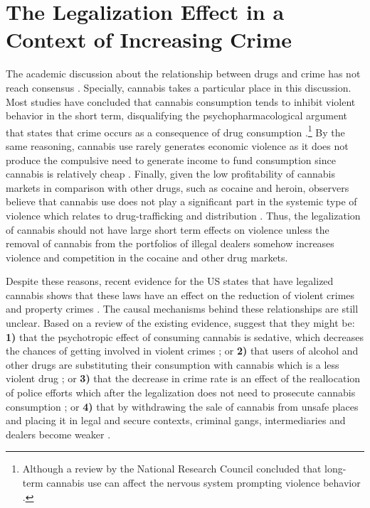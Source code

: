 \documentclass[11pt]{article}
\begin{document}
\section{The Legalization Effect in a Context of Increasing Crime}
The academic discussion about the relationship between drugs and crime has not reach consensus \citep{white2000dynamics}. Specially, cannabis takes a particular place in this discussion. Most studies have concluded that cannabis consumption tends to inhibit violent behavior in the short term, disqualifying the psychopharmacological argument \citep{white2000dynamics} that states that crime occurs as a consequence of drug consumption \citep{goldstein1985drugs}.\footnote{Although a review by the National Research Council concluded that long-term cannabis use can affect the nervous system prompting violence behavior \citep{national1994understanding}.} By the same reasoning, cannabis use rarely generates economic violence as it does not produce the compulsive need to generate income to fund consumption since cannabis is relatively cheap \citep{caulkins2016marijuana}. Finally, given the low profitability of cannabis markets in comparison with other drugs, such as cocaine and heroin, observers believe that cannabis use does not play a significant part in the systemic type of violence \citep{pacula2003marijuana, caulkins2015considering} which relates to drug-trafficking and distribution \citep{goldstein1985drugs}. Thus, the legalization of cannabis should not have large short term effects on violence unless the removal of cannabis from the portfolios of illegal dealers somehow increases violence and competition in the cocaine and other drug markets.

Despite these reasons, recent evidence for the US states that have legalized cannabis shows that these laws have an effect on the reduction of violent crimes and property crimes \citep{dragone2019crime, Indigo:2016, gavrilova2014legal, huber2016cannabis, brinkman2017not}. The causal mechanisms behind these relationships are still unclear. Based on a review of the existing evidence, \citet{dragone2019crime} suggest that they might be: \textbf{1)} that the psychotropic effect of consuming cannabis is sedative, which decreases the chances of getting involved in violent crimes \citep{no2001health, green2003being}; or \textbf{2)} that users of alcohol and other drugs are substituting their consumption with cannabis which is a less violent drug \citep{anderson2014legalization, kelly2014policing} ; or \textbf{3)} that the decrease in crime rate is an effect of the reallocation of police efforts which after the legalization does not need to prosecute cannabis consumption \citep{adda2014crime}; or \textbf{4)} that by withdrawing the sale of cannabis from unsafe places and placing it in legal and secure contexts, criminal gangs, intermediaries and dealers become weaker \citep{becker2013have}.
\end{document}
